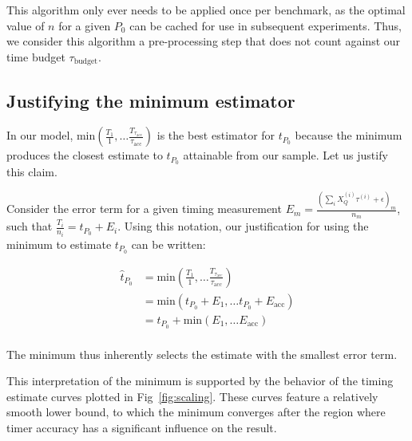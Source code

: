 \documentclass[conference]{IEEEtran}
\begin{document}
This algorithm only ever needs to be applied once per benchmark, as the optimal value of $n$
for a given $P_0$ can be cached for use in subsequent experiments. Thus, we consider this
algorithm a pre-processing step that does not count against our time budget
$\tau_{\textrm{budget}}$.

\subsection{Justifying the minimum estimator}


In our model, $\textrm{min}(\frac{T_1}{1}, \dots
\frac{T_{\tau_{\textrm{acc}}}}{\tau_{\textrm{acc}}})$ is the best estimator for $t_{P_0}$
because the minimum produces the closest estimate to $t_{P_0}$ attainable from our sample.
Let us justify this claim.

Consider the error term for a given timing measurement $E_m = \frac{\left(\sum_{i} X_Q^{(i)}
\tau^{(i)} + \epsilon \right)_m}{n_m}$, such that $\frac{T_i}{n_i} = t_{P_0} + E_i$. Using
this notation, our justification for using the minimum to estimate $t_{P_0}$ can be written:

\begin{align}
    \hat{t}_{P_0} &= \textrm{min}(\frac{T_1}{1}, \dots \frac{T_{\tau_{\textrm{acc}}}}{\tau_{\textrm{acc}}}) \\ \nonumber
                  &= \textrm{min}(t_{P_0} + E_1, \dots t_{P_0} + E_{\textrm{acc}}) \\ \nonumber
                  &= t_{P_0} + \textrm{min}(E_1, \dots E_{\textrm{acc}}) \\ \nonumber
\end{align}

The minimum thus inherently selects the estimate with the smallest error term.

This interpretation of the minimum is supported by the behavior of the timing estimate curves
plotted in Fig~\ref{fig:scaling}. These curves feature a relatively smooth lower
bound, to which the minimum converges after the region where timer accuracy has a
significant influence on the result. 
\end{document}
